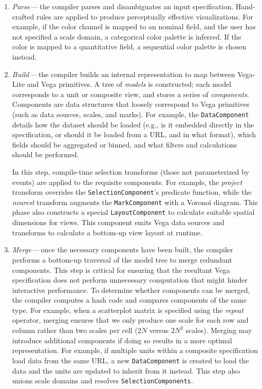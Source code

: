 \begin{enumerate}
  \item \emph{Parse}\,---\,the compiler parses and disambiguates an input
  specification. Hand-crafted rules are applied to produce perceptually
  effective visualizations. For example, if the color channel is mapped to an
nominal field, and the user has not specified a scale domain, a categorical
color palette is inferred. If the color is mapped to a quantitative field, a
sequential color palette is chosen instead.

  \item \emph{Build}\,---\,the compiler builds an internal representation to map
  between Vega-Lite and Vega primitives. A tree of \emph{models} is constructed;
  each model corresponds to a unit or composite view, and stores a series of
  \emph{components}. Components are data structures that loosely correspond to
  Vega primitives (such as data sources, scales, and marks). For example, the
  \texttt{DataComponent} details how the dataset should be loaded (e.g., is it
  embedded directly in the specification, or should it be loaded from a URL, and
  in what format), which fields should be aggregated or binned, and what filters
  and calculations should be performed.

  In this step, compile-time selection transforms (those not parameterized by
  events) are applied to the requisite components. For example, the
  \emph{project} transform overrides the \texttt{SelectionComponent}'s predicate
  function, while the \emph{nearest} transform augments the
  \texttt{MarkComponent} with a Voronoi diagram. This phase also constructs a
  special \texttt{LayoutComponent} to calculate suitable spatial dimensions for
  views. This component emits Vega data sources and transforms to calculate a
  bottom-up view layout at runtime.

  \item \emph{Merge}\,---\,once the necessary components have been built, the
  compiler performs a bottom-up traversal of the model tree to merge redundant
  components. This step is critical for ensuring that the resultant Vega
  specification does not perform unnecessary computation that might hinder
  interactive performance. To determine whether components can be merged, the
  compiler computes a hash code and compares components of the same
  type. For example, when a scatterplot matrix is specified using the
  \emph{repeat} operator, merging ensures that we only produce one scale for
  each row and column rather than two scales per cell ($2N$ versus $2N^2$
  scales). Merging may introduce additional components if doing so results in a
  more optimal representation. For example, if multiple units within a composite
  specification load data from the same URL, a new \texttt{DataComponent} is
  created to load the data and the units are updated to inherit from it instead.
  This step also unions scale domains and resolves \texttt{SelectionComponents}.


\end{enumerate}
